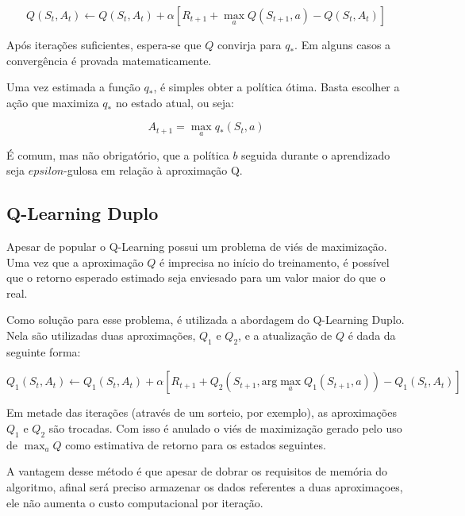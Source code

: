 \begin{equation}
Q(S_t, A_t) \leftarrow Q(S_t, A_t) + \alpha[R_{t+1} + \max_{a} Q(S_{t+1}, a) - Q(S_t, A_t)]
\end{equation}

Após iterações suficientes, espera-se que $Q$ convirja para $q_*$. Em alguns casos a convergência é provada matematicamente.

Uma vez estimada a função $q_*$, é simples obter a política ótima. Basta escolher a ação que maximiza $q_*$ no estado atual, ou seja:

\begin{equation}
A_{t+1} = \max_{a} q_*(S_t, a)
\end{equation}

É comum, mas não obrigatório, que a política $b$ seguida durante o aprendizado seja $epsilon$-gulosa em relação à aproximação Q.

\subsection{Q-Learning Duplo}

Apesar de popular o Q-Learning possui um problema de viés de maximização. Uma vez que a aproximação $Q$ é imprecisa no início do treinamento, é possível que o retorno esperado estimado seja enviesado para um valor maior do que o real.

Como solução para esse problema, é utilizada a abordagem do Q-Learning Duplo. Nela são utilizadas duas aproximações, $Q_1$ e $Q_2$, e a atualização de $Q$ é dada da seguinte forma:

\begin{equation}
\label{eq:doubleq}
Q_1(S_t, A_t) \leftarrow Q_1(S_t, A_t) + \alpha[R_{t+1} + Q_2(S_{t+1}, \text{arg}\max_a Q_1(S_{t+1}, a)) - Q_1(S_t, A_t)]
\end{equation}

Em metade das iterações (através de um sorteio, por exemplo), as aproximações $Q_1$ e $Q_2$ são trocadas. Com isso é anulado o viés de maximização gerado pelo uso de $\max_a Q$ como estimativa de retorno para os estados seguintes.

A vantagem desse método é que apesar de dobrar os requisitos de memória do algoritmo, afinal será preciso armazenar os dados referentes a duas aproximaçoes, ele não aumenta o custo computacional por iteração.
